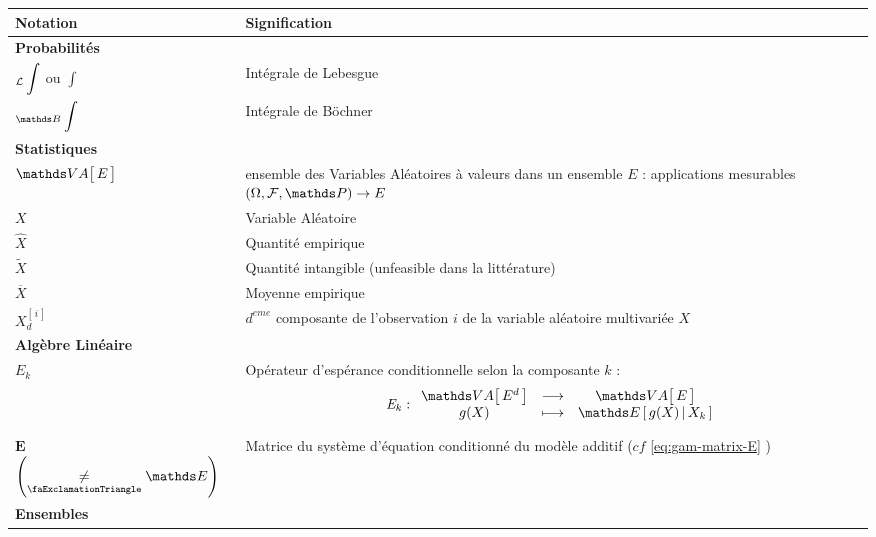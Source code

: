 \begin{tabularx}{\linewidth}{lX}
	\toprule
	\textbf{Notation}  & \textbf{Signification} \\
	\midrule
	\textbf{Probabilités} &                        \\
	\midrule

	${}_{\mathcal{L}}\displaystyle\int$ ou $\displaystyle\int$ & Intégrale de Lebesgue \\
	$\boch$ & Intégrale de Böchner \\

    \midrule
	\textbf{Statistiques} &                        \\
	\midrule

	$\VA{E}$ & ensemble des Variables Aléatoires à valeurs dans un ensemble $E$ : applications mesurables $(\Omega, \calF, \P) \rightarrow E$ \\

	$X$ & Variable Aléatoire\\
	$\widehat{X}$ & Quantité empirique \\
	$\widetilde{X}$ & Quantité intangible (\og unfeasible \fg dans la littérature)\\
	$\overline{X}$ & Moyenne empirique\\
	$X_d^{[ \, i \,]}$ & $d^{eme}$ composante de l'observation $i$ de la variable aléatoire multivariée $X$\\



	\midrule
	\textbf{Algèbre Linéaire} &                        \\
	\midrule

	$\mathit{E_k}$ & Opérateur d'espérance conditionnelle selon la composante $k$ : $$\mathit E_k : \func{\VA{E^d}}{\VA{E}}{g(X)}{\esperancesachant{X_k}{g(X)}}$$ \\
	$\mathbf E$ $\left(\underset {\textsf{\faExclamationTriangle}} {\neq} \E\right)$& Matrice du système d'équation conditionné du modèle additif ($cf$ \ref{eq:gam-matrix-E} )\\



	\midrule
	\textbf{Ensembles} &                        \\
	\midrule
\end{tabularx}